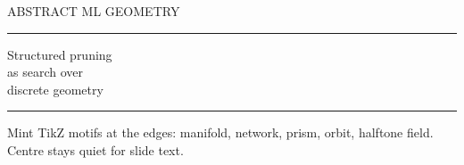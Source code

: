 \documentclass[aspectratio=169,11pt]{beamer}
\newcommand{\eyebrow}[1]{%
  {\fontsize{7.8}{9}\selectfont\ttfamily\MakeUppercase{#1}}%
}
\begin{document}
\begin{frame}[plain]
\vspace*{1.05cm}
\hspace*{0.30cm}
\begin{minipage}{.54\paperwidth}
  \eyebrow{Abstract ML Geometry}\par
  \vspace{.16cm}
  {\color{amberLight}\rule{1.0cm}{0.40pt}}\par
  \vspace{.36cm}
  {\fontsize{24}{28}\selectfont\color{crimson} Structured pruning}\\[-.02em]
  {\fontsize{24}{28}\selectfont as search over}\\[-.02em]
  {\fontsize{24}{28}\selectfont discrete geometry}\par
  \vspace{.36cm}
  {\color{amber!40}\rule{.92\linewidth}{0.36pt}}\par
  \vspace{.28cm}
  {\fontsize{9.2}{12}\selectfont\color{ink!72}%
   Mint TikZ motifs at the edges: manifold, network, prism,
   orbit, halftone field. Centre stays quiet for slide text.}
\end{minipage}
\end{frame}

\begin{frame}[plain]
\end{frame}
\end{document}
